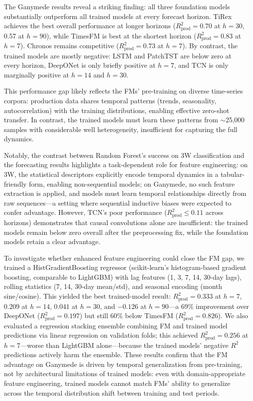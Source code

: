 \documentclass[conference]{IEEEtran}
\begin{document}
The Ganymede results reveal a striking finding: all three foundation models substantially outperform all trained models at every forecast horizon. TiRex achieves the best overall performance at longer horizons ($R^2_\text{prod}{=}0.70$ at $h{=}30$, 0.57 at $h{=}90$), while TimesFM is best at the shortest horizon ($R^2_\text{prod}{=}0.83$ at $h{=}7$). Chronos remains competitive ($R^2_\text{prod}{=}0.73$ at $h{=}7$). By contrast, the trained models are mostly negative: LSTM and PatchTST are below zero at every horizon, DeepONet is only briefly positive at $h{=}7$, and TCN is only marginally positive at $h{=}14$ and $h{=}30$.

This performance gap likely reflects the FMs' pre-training on diverse time-series corpora: production data shares temporal patterns (trends, seasonality, autocorrelation) with the training distributions, enabling effective zero-shot transfer. In contrast, the trained models must learn these patterns from $\sim$25{,}000 samples with considerable well heterogeneity, insufficient for capturing the full dynamics.

Notably, the contrast between Random Forest's success on 3W classification and the forecasting results highlights a task-dependent role for feature engineering: on 3W, the statistical descriptors explicitly encode temporal dynamics in a tabular-friendly form, enabling non-sequential models; on Ganymede, no such feature extraction is applied, and models must learn temporal relationships directly from raw sequences---a setting where sequential inductive biases were expected to confer advantage. However, TCN's poor performance ($R^2_\text{prod} \leq 0.11$ across horizons) demonstrates that causal convolutions alone are insufficient: the trained models remain below zero overall after the preprocessing fix, while the foundation models retain a clear advantage.

To investigate whether enhanced feature engineering could close the FM gap, we trained a HistGradientBoosting regressor (scikit-learn's histogram-based gradient boosting, comparable to LightGBM) with lag features (1, 3, 7, 14, 30-day lags), rolling statistics (7, 14, 30-day mean/std), and seasonal encoding (month sine/cosine). This yielded the best trained-model result: $R^2_\text{prod}{=}0.333$ at $h{=}7$, $0.209$ at $h{=}14$, $0.041$ at $h{=}30$, and $-0.126$ at $h{=}90$---a 69\% improvement over DeepONet ($R^2_\text{prod}{=}0.197$) but still 60\% below TimesFM ($R^2_\text{prod}{=}0.826$). We also evaluated a regression stacking ensemble combining FM and trained model predictions via linear regression on validation folds; this achieved $R^2_\text{prod}{=}0.256$ at $h{=}7$---worse than LightGBM alone---because the trained models' negative $R^2$ predictions actively harm the ensemble. These results confirm that the FM advantage on Ganymede is driven by temporal generalization from pre-training, not by architectural limitations of trained models: even with domain-appropriate feature engineering, trained models cannot match FMs' ability to generalize across the temporal distribution shift between training and test periods.
\end{document}
